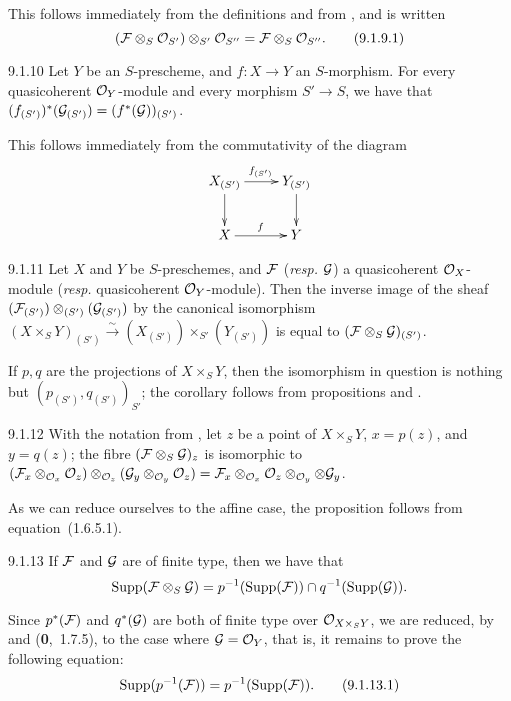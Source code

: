 This follows immediately from the definitions and from , and is
written
\[
  (\mathcal{F}\otimes_S\mathcal{O}_{S'})\otimes_{S'}\mathcal{O}_{S''}=\mathcal{F}\otimes_S\mathcal{O}_{S''}.\tag{9.1.9.1}
\]

\begin{env}[Proposition]{9.1.10}
Let $Y$ be an $S$-prescheme, and $f\colon X\to
Y$ an $S$-morphism. For every quasicoherent $\mathcal{O}_Y$-module and every morphism
$S'\to S$, we have that
$(f_{(S')})^\ast(\mathcal{G}_{(S')})=(f^\ast(\mathcal{G}))_{(S')}$.
\end{env}

This follows immediately from the commutativity of the diagram 
\[
  \xymatrix{
    X_{(S')}\ar[r]^{f_{(S')}}\ar[d] & Y_{(S')}\ar[d]\\
    X\ar[r]^f & Y
  }
\]

\begin{env}[Corollary]{9.1.11}
Let $X$ and $Y$ be $S$-preschemes, and
$\mathcal{F}$ (\emph{resp.} $\mathcal{G}$) a quasicoherent $\mathcal{O}_X$-module
(\emph{resp.} quasicoherent $\mathcal{O}_Y$-module). Then the inverse image of the sheaf
$(\mathcal{F}_{(S')})\otimes_{(S')}(\mathcal{G}_{(S')})$ by the canonical isomorphism
$(X\times_S Y)_{(S')}\xrightarrow{\sim}(X_{(S')})\times_{S'}(Y_{(S')})$
 is equal to $(\mathcal{F}\otimes_S\mathcal{G})_{(S')}$.
\end{env}

If $p,q$ are the projections of $X\times_S Y$, then the isomorphism in question
is nothing but $(p_{(S')}, q_{(S')})_{S'}$; the corollary follows from
propositions  and .

\begin{env}[Proposition]{9.1.12}
With the notation from , let $z$ be
a point of $X\times_S Y$, $x=p(z)$, and $y=q(z)$; the fibre
$(\mathcal{F}\otimes_S\mathcal{G})_z$ is isomorphic to
$(\mathcal{F}_x\otimes_{\mathcal{O}_x}\mathcal{O}_z)\otimes_{\mathcal{O}_z}(\mathcal{G}_y\otimes_{\mathcal{O}_y}\mathcal{O}_z)
=\mathcal{F}_x\otimes_{\mathcal{O}_x}\mathcal{O}_z\otimes_{\mathcal{O}_y}\otimes\mathcal{G}_y$.
\end{env}

As we can reduce ourselves to the affine case, the proposition follows from
equation~(1.6.5.1).

\begin{env}[Corollary]{9.1.13}
If $\mathcal{F}$ and $\mathcal{G}$ are of finite
type, then we have that
\[
  \operatorname{Supp}(\mathcal{F}\otimes_S\mathcal{G})
  =p^{-1}(\operatorname{Supp}(\mathcal{F}))\cap q^{-1}(\operatorname{Supp}(\mathcal{G})).
\]
\end{env}

Since $p^\ast(\mathcal{F})$ and $q^\ast(\mathcal{G})$ are both of finite type over
$\mathcal{O}_{X\times_S Y}$, we are reduced, by  and (\textbf{0},~1.7.5), to
the case where $\mathcal{G}=\mathcal{O}_Y$, that is, it remains to prove the following
equation:
\[
  \operatorname{Supp}(p^{-1}(\mathcal{F}))=p^{-1}(\operatorname{Supp}(\mathcal{F})).\tag{9.1.13.1}
\]

